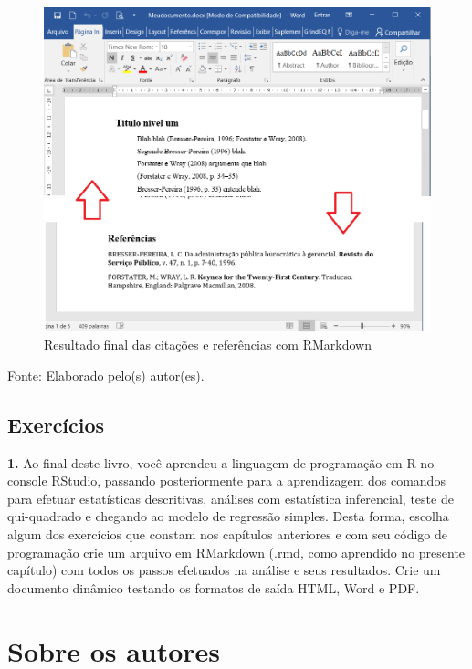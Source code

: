 \documentclass[12pt,brazil,oneside]{book}
\begin{document}
\begin{figure}[H]

{\centering \includegraphics[width=0.8\linewidth]{rmarkcitarf} 

}

\caption{Resultado final das citações e referências com RMarkdown}\label{fig:rmarkcitarf}
\end{figure}

Fonte: Elaborado pelo(s) autor(es).

\hypertarget{exercicios-2}{%
\section{Exercícios}\label{exercicios-2}}

\textbf{1.} Ao final deste livro, você aprendeu a linguagem de programação em R no console RStudio, passando posteriormente para a aprendizagem dos comandos para efetuar estatísticas descritivas, análises com estatística inferencial, teste de qui-quadrado e chegando ao modelo de regressão simples. Desta forma, escolha algum dos exercícios que constam nos capítulos anteriores e com seu código de programação crie um arquivo em RMarkdown (.rmd, como aprendido no presente capítulo) com todos os passos efetuados na análise e seus resultados. Crie um documento dinâmico testando os formatos de saída HTML, Word e PDF.

\hypertarget{sobre-os-autores}{%
\chapter*{Sobre os autores}\label{sobre-os-autores}}
\end{document}
